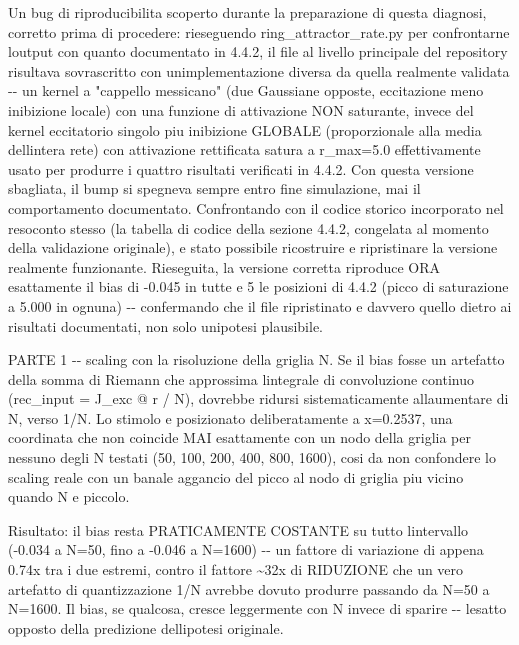 \documentclass[
  italian,
]{article}
\begin{document}
Un bug di riproducibilita\textquotesingle{} scoperto durante la preparazione di questa diagnosi, corretto prima di procedere: rieseguendo ring\_\allowbreak{}attractor\_\allowbreak{}rate.py per confrontarne l\textquotesingle output con quanto documentato in 4.4.2, il file al livello principale del repository risultava sovrascritto con un\textquotesingle implementazione diversa da quella realmente validata -\/- un kernel a "cappello messicano" (due Gaussiane opposte, eccitazione meno inibizione locale) con una funzione di attivazione NON saturante, invece del kernel eccitatorio singolo piu\textquotesingle{} inibizione GLOBALE (proporzionale alla media dell\textquotesingle intera rete) con attivazione rettificata satura a r\_\allowbreak{}max=5.0 effettivamente usato per produrre i quattro risultati verificati in 4.4.2. Con questa versione sbagliata, il bump si spegneva sempre entro fine simulazione, mai il comportamento documentato. Confrontando con il codice storico incorporato nel resoconto stesso (la tabella di codice della sezione 4.4.2, congelata al momento della validazione originale), e\textquotesingle{} stato possibile ricostruire e ripristinare la versione realmente funzionante. Rieseguita, la versione corretta riproduce ORA esattamente il bias di -0.045 in tutte e 5 le posizioni di 4.4.2 (picco di saturazione a 5.000 in ognuna) -\/- confermando che il file ripristinato e\textquotesingle{} davvero quello dietro ai risultati documentati, non solo un\textquotesingle ipotesi plausibile.

PARTE 1 -\/- scaling con la risoluzione della griglia N. Se il bias fosse un artefatto della somma di Riemann che approssima l\textquotesingle integrale di convoluzione continuo (rec\_\allowbreak{}input = J\_\allowbreak{}exc @ r / N), dovrebbe ridursi sistematicamente all\textquotesingle aumentare di N, verso 1/N. Lo stimolo e\textquotesingle{} posizionato deliberatamente a x=0.2537, una coordinata che non coincide MAI esattamente con un nodo della griglia per nessuno degli N testati (50, 100, 200, 400, 800, 1600), cosi\textquotesingle{} da non confondere lo scaling reale con un banale aggancio del picco al nodo di griglia piu\textquotesingle{} vicino quando N e\textquotesingle{} piccolo.

Risultato: il bias resta PRATICAMENTE COSTANTE su tutto l\textquotesingle intervallo (-0.034 a N=50, fino a -0.046 a N=1600) -\/- un fattore di variazione di appena 0.74x tra i due estremi, contro il fattore \textasciitilde32x di RIDUZIONE che un vero artefatto di quantizzazione 1/N avrebbe dovuto produrre passando da N=50 a N=1600. Il bias, se qualcosa, cresce leggermente con N invece di sparire -\/- l\textquotesingle esatto opposto della predizione dell\textquotesingle ipotesi originale.
\end{document}
